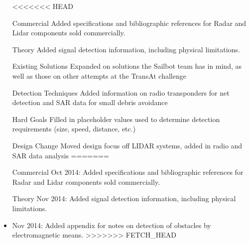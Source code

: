 \begin{itemize}
<<<<<<< HEAD
\item[Commercial] Added specifications and bibliographic references for Radar and Lidar components sold commercially.
\item[Theory] Added signal detection information, including physical limitations.
\item[Existing Solutions] Expanded on solutions the Sailbot team has in mind, as well as those on other attempts at the TransAt challenge
\item[Detection Techniques] Added information on radio transponders for net detection and SAR data for small debris avoidance
\item[Hard Goals] Filled in placeholder values used to determine detection requirements (size, speed, distance, etc.)
\item[Design Change] Moved design focus off LIDAR systems, added in radio and SAR data analysis
=======
\item[Commercial] Oct 2014: Added specifications and bibliographic references for Radar and Lidar components sold commercially.
\item[Theory] Nov 2014: Added signal detection information, including physical limitations.
\item Nov 2014: Added appendix for notes on detection of obstacles by electromagnetic means.
>>>>>>> FETCH_HEAD
\end{itemize}
